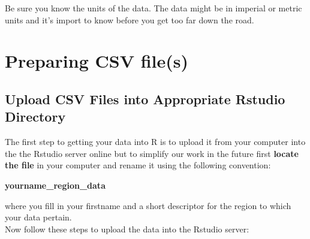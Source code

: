 \documentclass{article}\usepackage[]{graphicx}\usepackage[]{color}
\begin{document}
Be sure you know the units of the data. The data might be in imperial or metric units and it's import to know before you get too far down the road. 

\section{Preparing CSV file(s)}

\subsection{Upload CSV Files into Appropriate Rstudio Directory} 
The first step to getting your data into R is to upload it from your computer into the the Rstudio server online but to simplify our work in the future first \textbf{locate the file} in your computer and rename it using the following convention: \\ 
\begin{center}
\textbf{yourname\_region\_data}
\end{center}
where you fill in your firstname and a short descriptor for the region to which your data pertain. \\

Now follow these steps to upload the data into the Rstudio server:
\end{document}
